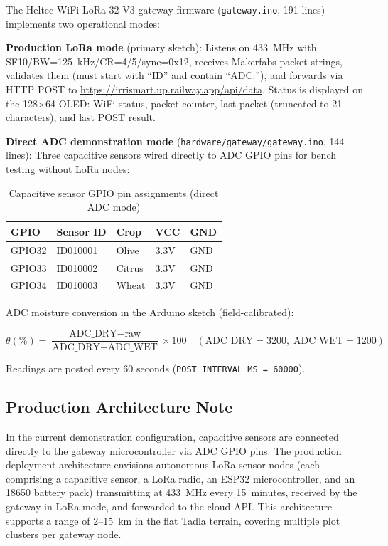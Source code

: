 \documentclass[12pt,a4paper]{report}
\begin{document}
The Heltec WiFi LoRa 32 V3 gateway firmware (\texttt{gateway.ino}, 191 lines) implements two operational modes:

\textbf{Production LoRa mode} (primary sketch): Listens on 433~MHz with SF10/BW=125~kHz/CR=4/5/sync=0x12, receives Makerfabs packet strings, validates them (must start with ``ID'' and contain ``ADC:''), and forwards via HTTP POST to \url{https://irrismart.up.railway.app/api/data}. Status is displayed on the 128$\times$64 OLED: WiFi status, packet counter, last packet (truncated to 21 characters), and last POST result.

\textbf{Direct ADC demonstration mode} (\texttt{hardware/gateway/gateway.ino}, 144 lines): Three capacitive sensors wired directly to ADC GPIO pins for bench testing without LoRa nodes:

\begin{table}[H]
\centering
\caption{Capacitive sensor GPIO pin assignments (direct ADC mode)}
\label{tab:gpio}
\begin{tabular}{lllll}
\toprule
\textbf{GPIO} & \textbf{Sensor ID} & \textbf{Crop} & \textbf{VCC} & \textbf{GND} \\
\midrule
GPIO32 & ID010001 & Olive  & 3.3V & GND \\
GPIO33 & ID010002 & Citrus & 3.3V & GND \\
GPIO34 & ID010003 & Wheat  & 3.3V & GND \\
\bottomrule
\end{tabular}
\end{table}

ADC moisture conversion in the Arduino sketch (field-calibrated):

\begin{equation}
  \theta(\%) = \frac{\text{ADC\_DRY} - \text{raw}}{\text{ADC\_DRY} - \text{ADC\_WET}} \times 100
  \quad (\text{ADC\_DRY}=3200,\;\text{ADC\_WET}=1200)
  \label{eq:adc_hw}
\end{equation}

Readings are posted every 60 seconds (\texttt{POST\_INTERVAL\_MS = 60000}).

\subsection{Production Architecture Note}

In the current demonstration configuration, capacitive sensors are connected directly to the gateway microcontroller via ADC GPIO pins. The production deployment architecture envisions autonomous LoRa sensor nodes (each comprising a capacitive sensor, a LoRa radio, an ESP32 microcontroller, and an 18650 battery pack) transmitting at 433~MHz every 15~minutes, received by the gateway in LoRa mode, and forwarded to the cloud API. This architecture supports a range of 2--15~km in the flat Tadla terrain, covering multiple plot clusters per gateway node.
\end{document}
